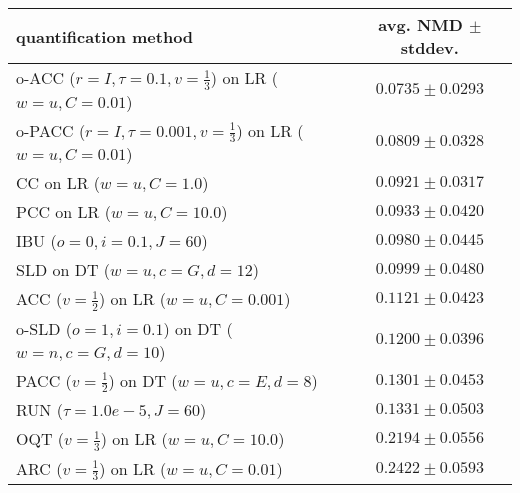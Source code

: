 \begin{tabular}{lc}
  \toprule
  quantification method & avg. NMD $\pm$ stddev. \\
  \midrule
  o-ACC ($r=I, \tau=0.1, v=\frac{1}{3}$) on LR ($w=u, C=0.01$) & $\mathbf{0.0735 \pm 0.0293}$ \\
  o-PACC ($r=I, \tau=0.001, v=\frac{1}{3}$) on LR ($w=u, C=0.01$) & $0.0809 \pm 0.0328$ \\
  CC on LR ($w=u, C=1.0$) & $0.0921 \pm 0.0317$ \\
  PCC on LR ($w=u, C=10.0$) & $0.0933 \pm 0.0420$ \\
  IBU ($o=0, i=0.1, J=60$) & $0.0980 \pm 0.0445$ \\
  SLD on DT ($w=u, c=G, d=12$) & $0.0999 \pm 0.0480$ \\
  ACC ($v=\frac{1}{2}$) on LR ($w=u, C=0.001$) & $0.1121 \pm 0.0423$ \\
  o-SLD ($o=1, i=0.1$) on DT ($w=n, c=G, d=10$) & $0.1200 \pm 0.0396$ \\
  PACC ($v=\frac{1}{2}$) on DT ($w=u, c=E, d=8$) & $0.1301 \pm 0.0453$ \\
  RUN ($\tau=1.0e-5, J=60$) & $0.1331 \pm 0.0503$ \\
  OQT ($v=\frac{1}{3}$) on LR ($w=u, C=10.0$) & $0.2194 \pm 0.0556$ \\
  ARC ($v=\frac{1}{3}$) on LR ($w=u, C=0.01$) & $0.2422 \pm 0.0593$ \\
  \bottomrule
\end{tabular}
